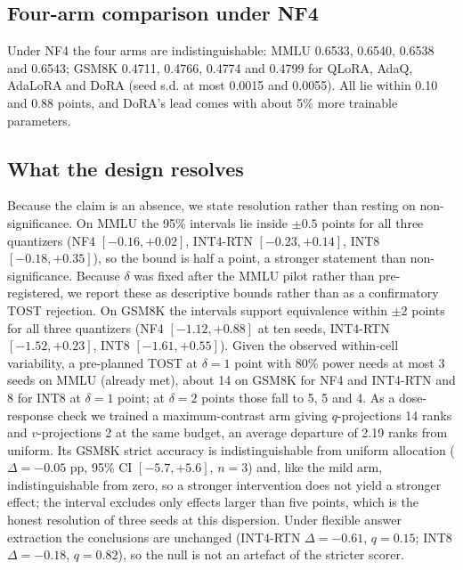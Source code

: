 \documentclass[preprint,12pt]{elsarticle}
\begin{document}
\subsection{Four-arm comparison under NF4}
\label{sec:full_comparison}

Under NF4 the four arms are indistinguishable: MMLU 0.6533, 0.6540, 0.6538 and 0.6543; GSM8K 0.4711, 0.4766, 0.4774 and 0.4799 for QLoRA, AdaQ, AdaLoRA and DoRA (seed s.d. at most 0.0015 and 0.0055). All lie within 0.10 and 0.88 points, and DoRA's lead comes with about 5\% more trainable parameters.

\subsection{What the design resolves}
\label{sec:power}

Because the claim is an absence, we state resolution rather than resting on non-significance. On MMLU the 95\% intervals lie inside $\pm 0.5$ points for all three quantizers (NF4 $[-0.16,+0.02]$, INT4-RTN $[-0.23,+0.14]$, INT8 $[-0.18,+0.35]$), so the bound is half a point, a stronger statement than non-significance. Because $\delta$ was fixed after the MMLU pilot rather than pre-registered, we report these as descriptive bounds rather than as a confirmatory TOST rejection. On GSM8K the intervals support equivalence within $\pm 2$ points for all three quantizers (NF4 $[-1.12,+0.88]$ at ten seeds, INT4-RTN $[-1.52,+0.23]$, INT8 $[-1.61,+0.55]$). Given the observed within-cell variability, a pre-planned TOST at $\delta = 1$ point with 80\% power needs at most 3 seeds on MMLU (already met), about 14 on GSM8K for NF4 and INT4-RTN and 8 for INT8 at $\delta = 1$ point; at $\delta = 2$ points those fall to 5, 5 and 4. As a dose-response check we trained a maximum-contrast arm giving $q$-projections 14 ranks and $v$-projections 2 at the same budget, an average departure of 2.19 ranks from uniform. Its GSM8K strict accuracy is indistinguishable from uniform allocation ($\Delta = -0.05$ pp, 95\% CI $[-5.7,+5.6]$, $n=3$) and, like the mild arm, indistinguishable from zero, so a stronger intervention does not yield a stronger effect; the interval excludes only effects larger than five points, which is the honest resolution of three seeds at this dispersion. Under flexible answer extraction the conclusions are unchanged (INT4-RTN $\Delta=-0.61$, $q=0.15$; INT8 $\Delta=-0.18$, $q=0.82$), so the null is not an artefact of the stricter scorer.

\end{document}
